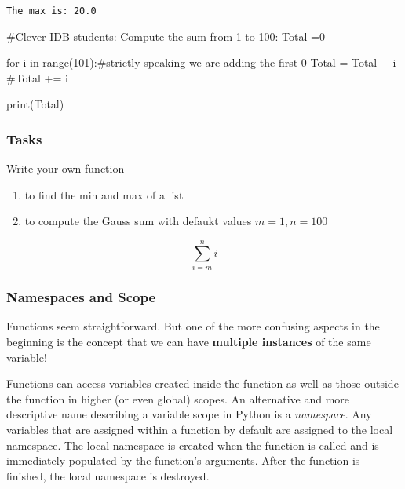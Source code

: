 \documentclass[
  letterpaper,
  DIV=11,
  numbers=noendperiod]{scrreprt}
\newenvironment{Shaded}{\begin{snugshade}}{\end{snugshade}}
\newcommand{\BuiltInTok}[1]{\textcolor[rgb]{0.00,0.23,0.31}{#1}}
\newcommand{\CommentTok}[1]{\textcolor[rgb]{0.37,0.37,0.37}{#1}}
\newcommand{\ControlFlowTok}[1]{\textcolor[rgb]{0.00,0.23,0.31}{#1}}
\newcommand{\DecValTok}[1]{\textcolor[rgb]{0.68,0.00,0.00}{#1}}
\newcommand{\KeywordTok}[1]{\textcolor[rgb]{0.00,0.23,0.31}{#1}}
\newcommand{\NormalTok}[1]{\textcolor[rgb]{0.00,0.23,0.31}{#1}}
\newcommand{\OperatorTok}[1]{\textcolor[rgb]{0.37,0.37,0.37}{#1}}
\providecommand{\tightlist}{%
  \setlength{\itemsep}{0pt}\setlength{\parskip}{0pt}}\usepackage{longtable,booktabs,array}
\begin{document}
\begin{verbatim}
The max is: 20.0
\end{verbatim}

\begin{Shaded}
\begin{Highlighting}[]
\CommentTok{\#Clever IDB students: Compute the sum from 1 to 100:}
\NormalTok{Total }\OperatorTok{=}\DecValTok{0}

\ControlFlowTok{for}\NormalTok{ i }\KeywordTok{in} \BuiltInTok{range}\NormalTok{(}\DecValTok{101}\NormalTok{):}\CommentTok{\#strictly speaking we are adding the first  0 }
\NormalTok{  Total }\OperatorTok{=}\NormalTok{ Total }\OperatorTok{+}\NormalTok{ i}
  \CommentTok{\#Total += i}

\BuiltInTok{print}\NormalTok{(Total)}
\end{Highlighting}
\end{Shaded}

\hypertarget{tasks}{%
\subsubsection{Tasks}\label{tasks}}

Write your own function

\begin{enumerate}
\def\labelenumi{\arabic{enumi}.}
\tightlist
\item
  to find the min and max of a list
\item
  to compute the Gauss sum with defaukt values \(m=1, n=100\)
\end{enumerate}

\[
\sum_{i=m}^{n}{i}
\]

\hypertarget{namespaces-and-scope}{%
\subsubsection{Namespaces and Scope}\label{namespaces-and-scope}}

Functions seem straightforward. But one of the more confusing aspects in
the beginning is the concept that we can have \textbf{multiple
instances} of the same variable!

Functions can access variables created inside the function as well as
those outside the function in higher (or even global) scopes. An
alternative and more descriptive name describing a variable scope in
Python is a \emph{namespace}. Any variables that are assigned within a
function by default are assigned to the local namespace. The local
namespace is created when the function is called and is immediately
populated by the function's arguments. After the function is finished,
the local namespace is destroyed.
\end{document}
